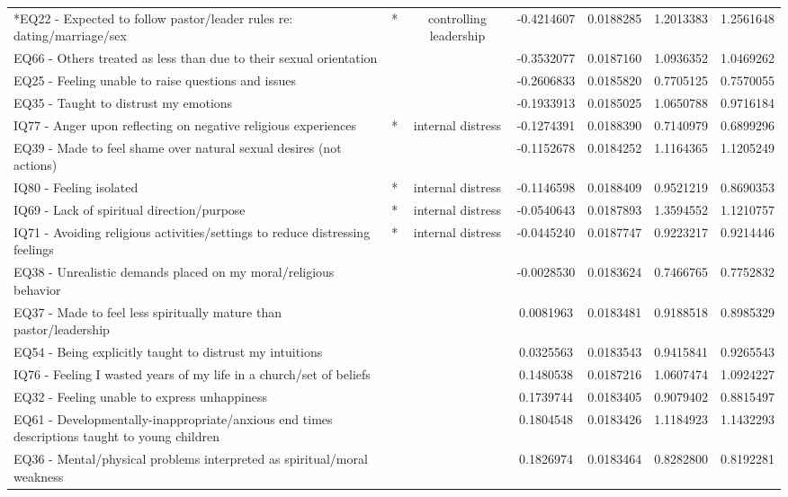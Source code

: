 \documentclass[
]{article}
\begin{document}
\begin{longtable}[t]{>{\raggedright\arraybackslash}p{11cm}cccccc}
\endfoot
\bottomrule
\endlastfoot
*EQ22 - Expected to follow pastor/leader rules re: dating/marriage/sex & * & controlling leadership & -0.4214607 & 0.0188285 & 1.2013383 & 1.2561648\\
EQ66 - Others treated as less than due to their sexual orientation &  &  & -0.3532077 & 0.0187160 & 1.0936352 & 1.0469262\\
EQ25 - Feeling unable to raise questions and issues &  &  & -0.2606833 & 0.0185820 & 0.7705125 & 0.7570055\\
EQ35 - Taught to distrust my emotions &  &  & -0.1933913 & 0.0185025 & 1.0650788 & 0.9716184\\
*IQ77 - Anger upon reflecting on negative religious experiences & * & internal distress & -0.1274391 & 0.0188390 & 0.7140979 & 0.6899296\\
\addlinespace
EQ39 - Made to feel shame over natural sexual desires (not actions) &  &  & -0.1152678 & 0.0184252 & 1.1164365 & 1.1205249\\
*IQ80 - Feeling isolated & * & internal distress & -0.1146598 & 0.0188409 & 0.9521219 & 0.8690353\\
*IQ69 - Lack of spiritual direction/purpose & * & internal distress & -0.0540643 & 0.0187893 & 1.3594552 & 1.1210757\\
*IQ71 - Avoiding religious activities/settings to reduce distressing feelings & * & internal distress & -0.0445240 & 0.0187747 & 0.9223217 & 0.9214446\\
EQ38 - Unrealistic demands placed on my moral/religious behavior &  &  & -0.0028530 & 0.0183624 & 0.7466765 & 0.7752832\\
\addlinespace
EQ37 - Made to feel less spiritually mature than pastor/leadership &  &  & 0.0081963 & 0.0183481 & 0.9188518 & 0.8985329\\
EQ54 - Being explicitly taught to distrust my intuitions &  &  & 0.0325563 & 0.0183543 & 0.9415841 & 0.9265543\\
IQ76 - Feeling I wasted years of my life in a church/set of beliefs &  &  & 0.1480538 & 0.0187216 & 1.0607474 & 1.0924227\\
EQ32 - Feeling unable to express unhappiness &  &  & 0.1739744 & 0.0183405 & 0.9079402 & 0.8815497\\
EQ61 - Developmentally-inappropriate/anxious end times descriptions taught to young children &  &  & 0.1804548 & 0.0183426 & 1.1184923 & 1.1432293\\
\addlinespace
EQ36 - Mental/physical problems interpreted as spiritual/moral weakness &  &  & 0.1826974 & 0.0183464 & 0.8282800 & 0.8192281\\

\end{longtable}
\end{document}
